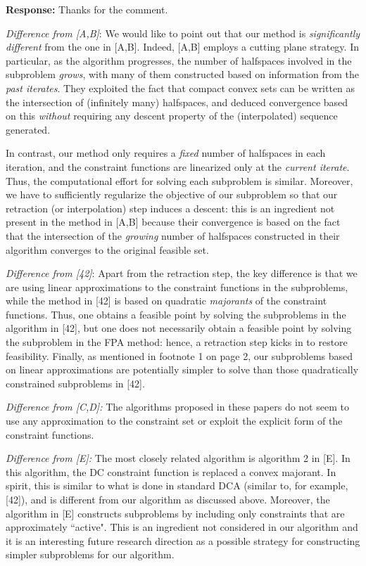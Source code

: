 \documentclass{article}
\begin{document}
\begin{enumerate}
    \textbf{Response:} Thanks for the comment.

    {\it Difference from [A,B]}: We would like to point out that our method is {\it significantly different} from the one in [A,B]. Indeed, [A,B] employs a cutting plane strategy. In particular, as the algorithm progresses, the number of halfspaces involved in the subproblem {\em grows}, with many of them constructed based on information from the \emph{past iterates}. They exploited the fact that compact convex sets can be written as the intersection of (infinitely many) halfspaces, and deduced convergence based on this {\em without} requiring any descent property of the (interpolated) sequence generated.

    In contrast, our method only requires a {\it fixed} number of halfspaces in each iteration, and the constraint functions are linearized only at the \emph{current iterate}. Thus, the computational effort for solving each subproblem is similar. Moreover, we have to sufficiently regularize the objective of our subproblem so that our retraction (or interpolation) step induces a descent: this is an ingredient not present in the method in [A,B] because their convergence is based on the fact that the intersection of the \emph{growing} number of halfspaces constructed in their algorithm converges to the original feasible set.

    {\it Difference from [42]}: Apart from the retraction step, the key difference is that we are using linear approximations to the constraint functions in the subproblems, while the method in [42] is based on quadratic \emph{majorants} of the constraint functions. Thus, one obtains a feasible point by solving the subproblems in the algorithm in [42], but one does not necessarily obtain a feasible point by solving the subproblem in the FPA method: hence, a retraction step kicks in to restore feasibility. Finally, as mentioned in footnote 1 on page 2, our subproblems based on linear approximations are potentially simpler to solve than those quadratically constrained subproblems in [42].

    {\it Difference from [C,D]:} The algorithms proposed in these papers do not seem to use any approximation to the constraint set or exploit the explicit form of the constraint functions.

    {\it Difference from [E]:} The most closely related algorithm is algorithm 2 in [E]. In this algorithm, the DC constraint function is replaced a convex majorant. In spirit, this is similar to what is done in standard DCA (similar to, for example, [42]), and is different from our algorithm as discussed above. Moreover, the algorithm in [E] constructs subproblems by including only constraints that are approximately ``active". This is an ingredient not considered in our algorithm and it is an interesting future research direction as a possible strategy for constructing simpler subproblems for our algorithm.


\end{enumerate}
\end{document}
